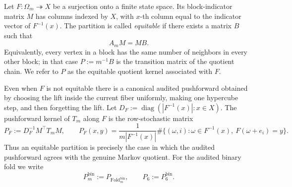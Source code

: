 \documentclass[12pt,a4paper]{article}
\theoremstyle{plain}
\theoremstyle{definition}
\numberwithin{equation}{section}
\newcommand{\Fold}{\operatorname{Fold}}
\begin{document}
Let \(F:\Omega_m\twoheadrightarrow X\) be a surjection onto a finite state space. Its block-indicator matrix \(M\) has columns indexed by \(X\), with \(x\)-th column equal to the indicator vector of \(F^{-1}(x)\). The partition is called \emph{equitable} if there exists a matrix \(B\) such that
\[
A_m M = M B.
\]
Equivalently, every vertex in a block has the same number of neighbors in every other block; in that case \(P:=m^{-1}B\) is the transition matrix of the quotient chain. We refer to \(P\) as the equitable quotient kernel associated with \(F\).

Even when \(F\) is not equitable there is a canonical audited pushforward obtained by choosing the lift inside the current fiber uniformly, making one hypercube step, and then forgetting the lift.
Let \(D_F:=\operatorname{diag}(|F^{-1}(x)|:x\in X)\).  The pushforward kernel of \(T_m\) along \(F\) is the row-stochastic matrix
\[
P_F:=D_F^{-1}M^\top T_mM,
\qquad
P_F(x,y)=\frac{1}{m|F^{-1}(x)|}
\#\{(\omega,i):\omega\in F^{-1}(x),\ F(\omega+e_i)=y\}.
\]
Thus an equitable partition is precisely the case in which the audited pushforward agrees with the genuine Markov quotient.  For the audited binary fold we write
\[
P_m^{\mathrm{bin}}:=P_{\Fold_m^{\mathrm{bin}}},
\qquad
P_6:=P_6^{\mathrm{bin}}.
\]
\end{document}
